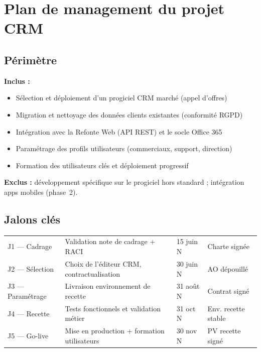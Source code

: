 \documentclass[11pt,a4paper,oneside]{report}
\begin{document}
\section{Plan de management du projet CRM}

\subsection{Périmètre}

\textbf{Inclus :}
\begin{itemize}
  \item Sélection et déploiement d'un progiciel CRM marché (appel d'offres)
  \item Migration et nettoyage des données clients existantes (conformité RGPD)
  \item Intégration avec la Refonte Web (API REST) et le socle Office 365
  \item Paramétrage des profils utilisateurs (commerciaux, support, direction)
  \item Formation des utilisateurs clés et déploiement progressif
\end{itemize}
\textbf{Exclus :} développement spécifique sur le progiciel hors standard ; intégration apps mobiles (phase~2).

\subsection{Jalons clés}

\begin{center}
\renewcommand{\arraystretch}{1.5}
\begin{tabularx}{\textwidth}{C{2.2cm} L{5.5cm} C{2.8cm} L{3.5cm}}
\toprule
{}
 &  &  &  \\
\midrule
J1 — Cadrage       & Validation note de cadrage + RACI             & 15 juin N  & Charte signée \\
J2 — Sélection     & Choix de l'éditeur CRM, contractualisation     & 30 juin N  & AO dépouillé \\
J3 — Paramétrage   & Livraison environnement de recette             & 31 août N  & Contrat signé \\
J4 — Recette       & Tests fonctionnels et validation métier        & 31 oct N   & Env. recette stable \\
J5 — Go-live       & Mise en production + formation utilisateurs    & 30 nov N   & PV recette signé \\
\bottomrule
\end{tabularx}
\end{center}
\end{document}
